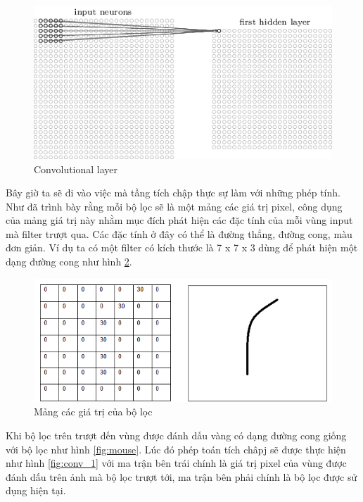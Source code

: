 		\begin{figure}[h!]
			\centering
			\includegraphics[scale=0.8]{charts/conv_layer2.png}
			\caption{Convolutional layer}
			\label{fig:conv_layer2}
		\end{figure}
		
		Bây giờ ta sẽ đi vào việc mà tầng tích chập thực sự làm với những phép tính. Như đã trình bày rằng mỗi bộ lọc sẽ là một mảng các giá trị pixel, công dụng của mảng giá trị này nhằm mục đích phát hiện các đặc tính của mỗi vùng input mà filter trượt qua. Các đặc tính ở đây có thể là đường thẳng, đường cong, màu đơn giản. Ví dụ ta có một filter có kích thước là 7 x 7 x 3 dùng để phát hiện một dạng đường cong như hình \ref{fig:filter}.
		
		\begin{figure}[h!]
			\centering
			\includegraphics[scale=0.5]{charts/filter.png}
			\caption{Mảng các giá trị của bộ lọc}
			\label{fig:filter}
		\end{figure}
		
		Khi bộ lọc trên trượt đến vùng được đánh dấu vàng có dạng đường cong giống với bộ lọc như hình \ref{fig:mouse}. Lúc đó phép toán   tích châpj sẽ được thực hiện như hình \ref{fig:conv_1} với ma trận bên trái chính là giá trị pixel của vùng được đánh dấu trên ảnh mà bộ lọc trượt tới, ma trận bên phải chính là bộ lọc được sử dụng hiện tại.
		
